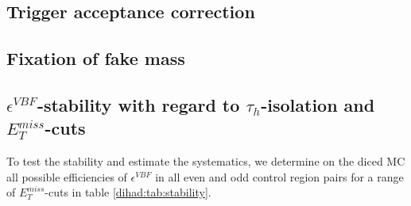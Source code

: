 \subsection*{Trigger acceptance correction}

\subsection*{Fixation of fake \hadtau mass}

\subsection{$\epsilon^{VBF}$-stability with regard to $\tau_{h}$-isolation and $E_{T}^{miss}$-cuts}\label{dihad:subsec:stability}
To test the stability and estimate the systematics, we determine on the diced MC all possible efficiencies of $\epsilon^{VBF}$ in all even and odd control region pairs for a range of $E_{T}^{miss}$-cuts in table \ref{dihad:tab:stability}.
